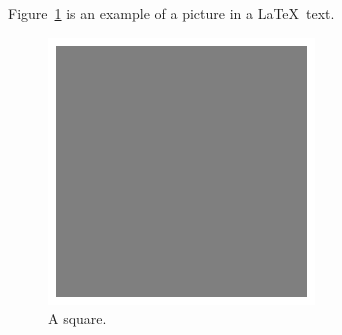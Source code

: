 \documentclass{article} %
\begin{document}
Figure~\ref{fig:square} is an example of a picture in a \LaTeX\ text. %
\begin{figure}[hbt] %
    \begin{center} %
        \includegraphics{p2.eps} %
        \caption{A square.} %
        \label{fig:square} %
    \end{center}
\end{figure}
\end{document}
